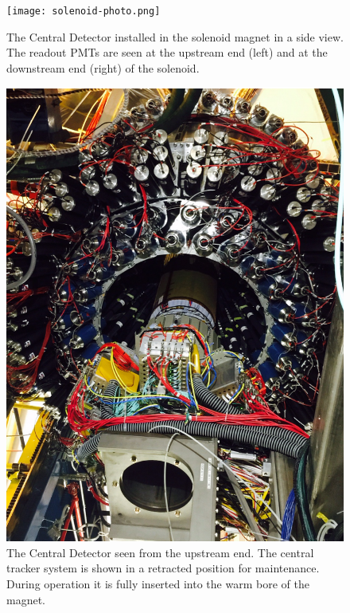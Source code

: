 \documentclass[final,3p]{elsarticle}
\begin{document}
\begin{twocolumn}
\begin{figure}[thp!]
\centerline{\texttt{[image: solenoid-photo.png]}}
\caption{The Central Detector installed in the solenoid magnet in a side view. The readout PMTs are seen at the
  upstream end (left) and at the downstream end (right) of the solenoid.}
\label{CDinSol}
\centerline{\includegraphics[width=1.0\columnwidth]{CLAS12-CD.png}}
\caption{The Central Detector seen from the upstream end. The central tracker system is shown in a retracted
  position for maintenance. During operation it is fully inserted into the warm bore of the magnet.}
\label{CDback}
\end{figure}
\begin{figure}[ht!]

\end{figure}
\end{twocolumn}
\end{document}
